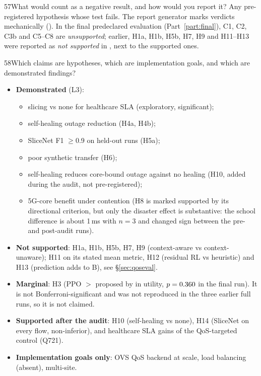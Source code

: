 \begin{qa}{57}{What would count as a negative result, and how would you report it?}
Any pre-registered hypothesis whose test fails. The report generator marks verdicts mechanically
(). In the final predeclared evaluation (Part~\ref{part:final}), C1, C2, C3b and C5--C8
are \emph{unsupported}; earlier, H1a, H1b, H5b, H7, H9 and H11--H13 were reported as \emph{not supported} in
, next to the supported ones.
\end{qa}

\begin{qa}{58}{Which claims are hypotheses, which are implementation goals, and which are demonstrated findings?}
\begin{itemize}
\item \textbf{Demonstrated} (L3):
  \begin{itemize}
  \item slicing vs none for healthcare SLA (exploratory, significant);
  \item self-healing outage reduction (H4a, H4b);
  \item SliceNet F1 $\ge$0.9 on held-out runs (H5a);
  \item poor synthetic transfer (H6);
  \item self-healing reduces core-bound outage against no healing (H10, added during the audit, not pre-registered);
  \item 5G-core benefit under contention (H8 is marked supported by its directional criterion, but only the disaster effect is substantive: the school difference is about 1\,ms with $n=3$ and changed sign between the pre- and post-audit runs).
  \end{itemize}
\item \textbf{Not supported}: H1a, H1b, H5b, H7, H9 (context-aware vs context-unaware); H11 on its stated mean metric,
  H12 (residual RL vs heuristic) and H13 (prediction adds to B), see \S\ref{sec:qoseval}.
\item \textbf{Marginal}: H3 (PPO $>$ proposed by \NPpoDelta{} in utility, $p=0.360$ in the final run). It is not
  Bonferroni-significant and was not reproduced in the three earlier full runs, so it is not claimed.
\item \textbf{Supported after the audit}: H10 (self-healing vs none), H14 (SliceNet on every flow, non-inferior),
  and healthcare SLA gains of the QoS-targeted control (Q721).
\item \textbf{Implementation goals only}: OVS QoS backend at scale, load balancing (absent), multi-site.
\end{itemize}
\end{qa}
